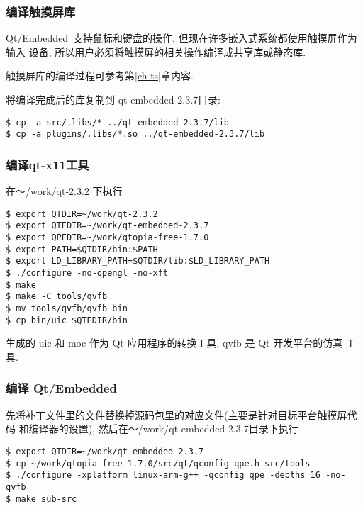 \subsubsection{编译触摸屏库}
	Qt/Embedded~支持鼠标和键盘的操作, 但现在许多嵌入式系统都使用触摸屏作为输入
设备, 所以用户必须将触摸屏的相关操作编译成共享库或静态库.

	触摸屏库的编译过程可参考第\ref{ch-ts}章内容.

	将编译完成后的库复制到 qt-embedded-2.3.7目录:

\begin{boxedminipage}{.9\textwidth}
\begin{verbatim}
$ cp -a src/.libs/* ../qt-embedded-2.3.7/lib
$ cp -a plugins/.libs/*.so ../qt-embedded-2.3.7/lib
\end{verbatim}
\end{boxedminipage}

\subsubsection{编译qt-x11工具}
	在～/work/qt-2.3.2 下执行

\begin{boxedminipage}{.9\textwidth}
\begin{verbatim}
$ export QTDIR=~/work/qt-2.3.2
$ export QTEDIR=~/work/qt-embedded-2.3.7
$ export QPEDIR=~/work/qtopia-free-1.7.0
$ export PATH=$QTDIR/bin:$PATH
$ export LD_LIBRARY_PATH=$QTDIR/lib:$LD_LIBRARY_PATH
$ ./configure -no-opengl -no-xft
$ make
$ make -C tools/qvfb
$ mv tools/qvfb/qvfb bin
$ cp bin/uic $QTEDIR/bin
\end{verbatim}
\end{boxedminipage}

	生成的 uic 和 moc 作为 Qt 应用程序的转换工具, qvfb 是 Qt 开发平台的仿真
工具.

\subsubsection{编译 Qt/Embedded}
	先将补丁文件里的文件替换掉源码包里的对应文件(主要是针对目标平台触摸屏代码
和编译器的设置), 然后在～/work/qt-embedded-2.3.7目录下执行

\begin{boxedminipage}{.9\textwidth}
\begin{verbatim} 
$ export QTDIR=~/work/qt-embedded-2.3.7
$ cp ~/work/qtopia-free-1.7.0/src/qt/qconfig-qpe.h src/tools
$ ./configure -xplatform linux-arm-g++ -qconfig qpe -depths 16 -no-qvfb
$ make sub-src
\end{verbatim}
\end{boxedminipage}

